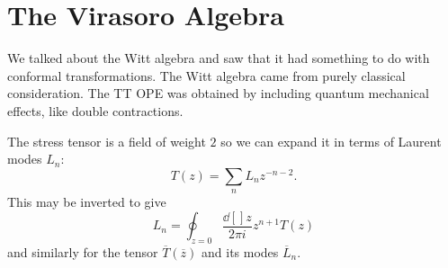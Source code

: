 \section{The Virasoro Algebra}%
\label{sec:the_virasoro_algebra}

We talked about the Witt algebra and saw that it had something to do with conformal transformations.
The Witt algebra came from purely classical consideration. The TT OPE was obtained by including quantum mechanical effects, like double contractions.

The stress tensor is a field of weight $2$ so we can expand it in terms of Laurent modes $L_n$:
\begin{equation}
  T(z) = \sum_n L_n z^{-n-2}.
\end{equation}
This may be inverted to give 
\begin{equation}
  L_n = \oint_{z = 0} \frac{\dd[]{z}}{2 \pi i } z^{n+1} T(z)
\end{equation}
and similarly for the tensor $\overline{T}{}(\overline{z}{})$ and its modes $\overline{L}{}_n$.

